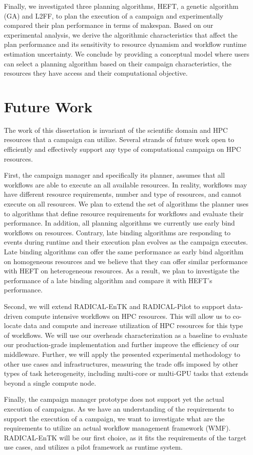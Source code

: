 Finally, we investigated three planning algorithms, HEFT, a genetic algorithm (GA) and L2FF, to plan the execution of a campaign and experimentally compared their plan performance in terms of makespan.
Based on our experimental analysis, we derive the algorithmic characteristics that affect the plan performance and its sensitivity to resource dynamism and workflow runtime estimation uncertainty.
We conclude by providing a conceptual model where users can select a planning algorithm based on their campaign characteristics, the resources they have access and their computational objective.


\section{Future Work}
The work of this dissertation is invariant of the scientific domain and HPC resources that a campaign can utilize.
Several strands of future work open to efficiently and effectively support any type of computational campaign on HPC resources.

First, the campaign manager and specifically its planner, assumes that all workflows are able to execute an all available resources.
In reality, workflows may have different resource requirements, number and type of resources, and cannot execute on all resources.
We plan to extend the set of algorithms the planner uses to algorithms that define resource requirements for workflows and evaluate their performance.
In addition, all planning algorithms we currently use early bind workflows on resources.
Contrary, late binding algorithms are responding to events during runtime and their execution plan evolves as the campaign executes.
Late binding algorithms can offer the same performance as early bind algorithm on homogeneous resources and we believe that they can offer similar performance with HEFT on heterogeneous resources.
As a result, we plan to investigate the performance of a late binding algorithm and compare it with HEFT's performance.

Second, we will extend RADICAL-EnTK and RADICAL-Pilot to support data-driven compute intensive workflows on HPC resources.
This will allow us to co-locate data and compute and increase utilization of HPC resources for this type of workflows.
We will use our overheads characterization as a baseline to evaluate our production-grade implementation and further improve the efficiency of our middleware. 
Further, we will apply the presented experimental methodology to other use cases and infrastructures, measuring the trade offs imposed by other types of task heterogeneity, including multi-core or multi-GPU tasks that extends beyond a single compute node.

Finally, the campaign manager prototype does not support yet the actual execution of campaigns.
As we have an understanding of the requirements to support the execution of a campaign, we want to investigate what are the requirements to utilize an actual workflow management framework (WMF).
RADICAL-EnTK will be our first choice, as it fits the requirements of the target use cases, and utilizes a pilot framework as runtime system.

